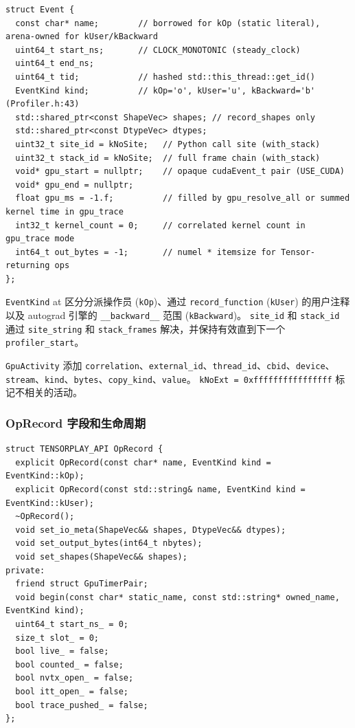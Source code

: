 \begin{lstlisting}[caption={Event layout.}, label=lst:eventfields, style=cppstyle]
struct Event {
  const char* name;        // borrowed for kOp (static literal), arena-owned for kUser/kBackward
  uint64_t start_ns;       // CLOCK_MONOTONIC (steady_clock)
  uint64_t end_ns;
  uint64_t tid;            // hashed std::this_thread::get_id()
  EventKind kind;          // kOp='o', kUser='u', kBackward='b' (Profiler.h:43)
  std::shared_ptr<const ShapeVec> shapes; // record_shapes only
  std::shared_ptr<const DtypeVec> dtypes;
  uint32_t site_id = kNoSite;   // Python call site (with_stack)
  uint32_t stack_id = kNoSite;  // full frame chain (with_stack)
  void* gpu_start = nullptr;    // opaque cudaEvent_t pair (USE_CUDA)
  void* gpu_end = nullptr;
  float gpu_ms = -1.f;          // filled by gpu_resolve_all or summed kernel time in gpu_trace
  int32_t kernel_count = 0;     // correlated kernel count in gpu_trace mode
  int64_t out_bytes = -1;       // numel * itemsize for Tensor-returning ops
};
\end{lstlisting}

\texttt{EventKind} at 区分分派操作员 (\texttt{kOp})、通过 \texttt{record\_function} (\texttt{kUser}) 的用户注释以及 autograd 引擎的 \texttt{\_\_backward\_\_} 范围 (\texttt{kBackward})。 \texttt{site\_id} 和 \texttt{stack\_id} 通过 \texttt{site\_string} 和 \texttt{stack\_frames} 解决，并保持有效直到下一个 \texttt{profiler\_start}。

\texttt{GpuActivity} 添加 \texttt{correlation}、\texttt{external\_id}、\texttt{thread\_id}、\texttt{cbid}、\texttt{device}、\texttt{stream}、\texttt{kind}、\texttt{bytes}、\texttt{copy\_kind}、\texttt{value}。 \texttt{kNoExt = 0xffffffffffffffff} 标记不相关的活动。

\subsubsection{OpRecord 字段和生命周期}

\begin{lstlisting}[caption={OpRecord handle.}, label=lst:oprecorddecl, style=cppstyle]
struct TENSORPLAY_API OpRecord {
  explicit OpRecord(const char* name, EventKind kind = EventKind::kOp);
  explicit OpRecord(const std::string& name, EventKind kind = EventKind::kUser);
  ~OpRecord();
  void set_io_meta(ShapeVec&& shapes, DtypeVec&& dtypes);
  void set_output_bytes(int64_t nbytes);
  void set_shapes(ShapeVec&& shapes);
private:
  friend struct GpuTimerPair;
  void begin(const char* static_name, const std::string* owned_name, EventKind kind);
  uint64_t start_ns_ = 0;
  size_t slot_ = 0;
  bool live_ = false;
  bool counted_ = false;
  bool nvtx_open_ = false;
  bool itt_open_ = false;
  bool trace_pushed_ = false;
};
\end{lstlisting}

